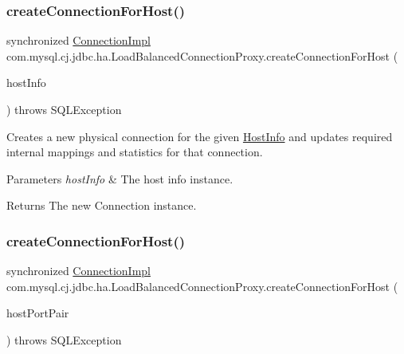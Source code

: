 \subsubsection{\texorpdfstring{create\+Connection\+For\+Host()}{createConnectionForHost()}\hspace{0.1cm}{\footnotesize\ttfamily [1/2]}}
{\footnotesize\ttfamily synchronized \mbox{\hyperlink{classcom_1_1mysql_1_1cj_1_1jdbc_1_1_connection_impl}{Connection\+Impl}} com.\+mysql.\+cj.\+jdbc.\+ha.\+Load\+Balanced\+Connection\+Proxy.\+create\+Connection\+For\+Host (\begin{DoxyParamCaption}\item[{\mbox{\hyperlink{classcom_1_1mysql_1_1cj_1_1conf_1_1_host_info}{Host\+Info}}}]{host\+Info }\end{DoxyParamCaption}) throws S\+Q\+L\+Exception}

Creates a new physical connection for the given \mbox{\hyperlink{}{Host\+Info}} and updates required internal mappings and statistics for that connection.


\begin{DoxyParams}{Parameters}
{\em host\+Info} & The host info instance. \\
\hline
\end{DoxyParams}
\begin{DoxyReturn}{Returns}
The new Connection instance. 
\end{DoxyReturn}
\mbox{\label{classcom_1_1mysql_1_1cj_1_1jdbc_1_1ha_1_1_load_balanced_connection_proxy_a27662d65e82acb86f3cc6af3f4f331ee}} 
\subsubsection{\texorpdfstring{create\+Connection\+For\+Host()}{createConnectionForHost()}\hspace{0.1cm}{\footnotesize\ttfamily [2/2]}}
{\footnotesize\ttfamily synchronized \mbox{\hyperlink{classcom_1_1mysql_1_1cj_1_1jdbc_1_1_connection_impl}{Connection\+Impl}} com.\+mysql.\+cj.\+jdbc.\+ha.\+Load\+Balanced\+Connection\+Proxy.\+create\+Connection\+For\+Host (\begin{DoxyParamCaption}\item[{String}]{host\+Port\+Pair }\end{DoxyParamCaption}) throws S\+Q\+L\+Exception}

